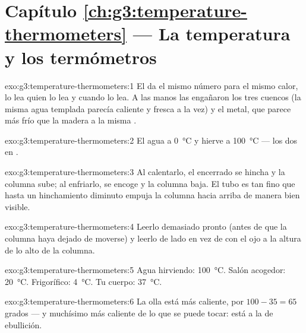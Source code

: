 \section*{Capítulo \ref{ch:g3:temperature-thermometers} --- La temperatura y los termómetros}

\begin{solution}{exo:g3:temperature-thermometers:1}
El  da el mismo número para el mismo calor, lo lea quien
lo lea y cuando lo lea. A las manos las engañaron los tres cuencos (la
misma agua templada parecía caliente y fresca a la vez) y el metal,
que parece más frío que la madera a la misma .
\end{solution}

\begin{solution}{exo:g3:temperature-thermometers:2}
El agua  a \qty{0}{\celsius} y hierve a
\qty{100}{\celsius} --- los dos en .
\end{solution}

\begin{solution}{exo:g3:temperature-thermometers:3}
Al calentarlo, el  encerrado se hincha y la columna sube; al
enfriarlo, se encoge y la columna baja. El tubo es tan fino que hasta
un hinchamiento diminuto empuja la columna hacia arriba de manera bien
visible.
\end{solution}

\begin{solution}{exo:g3:temperature-thermometers:4}
Leerlo demasiado pronto (antes de que la columna haya dejado de
moverse) y leerlo de lado en vez de con el ojo a la altura de lo alto
de la columna.
\end{solution}

\begin{solution}{exo:g3:temperature-thermometers:5}
Agua hirviendo: \qty{100}{\celsius}. Salón acogedor:
\qty{20}{\celsius}. Frigorífico: \qty{4}{\celsius}. Tu cuerpo:
\qty{37}{\celsius}.
\end{solution}

\begin{solution}{exo:g3:temperature-thermometers:6}
La olla está más caliente, por $100 - 35 = 65$ grados --- y muchísimo
más caliente de lo que se puede tocar: está a la  de
ebullición.
\end{solution}

